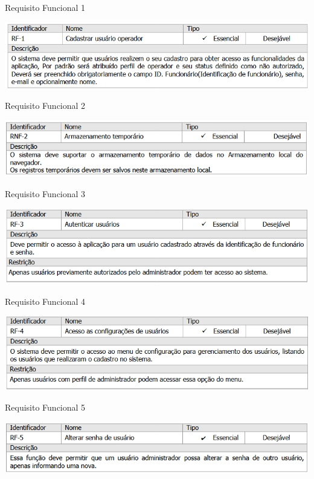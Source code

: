 \begin{table}[H]\label{tab:rf01}
    \caption{Requisito Funcional 1}
    \centering
    \includegraphics[scale=0.73]{imagens/rf01.png}
\end{table}
\begin{table}[H]\label{tab:rf02}
    \caption{Requisito Funcional 2}
    \centering
    \includegraphics[scale=0.8]{imagens/rf02.png}
\end{table}
\begin{table}[H]\label{tab:rf03}
    \caption{Requisito Funcional 3}
    \centering
    \includegraphics[scale=0.73]{imagens/rf03.png}
\end{table}
\begin{table}[H]\label{tab:rf04}
    \caption{Requisito Funcional 4}
    \centering
    \includegraphics[scale=0.73]{imagens/rf04.png}
\end{table}
\begin{table}[H]\label{tab:rf05}
    \caption{Requisito Funcional 5}
    \centering
    \includegraphics[scale=0.8]{imagens/rf05.png}
\end{table}
